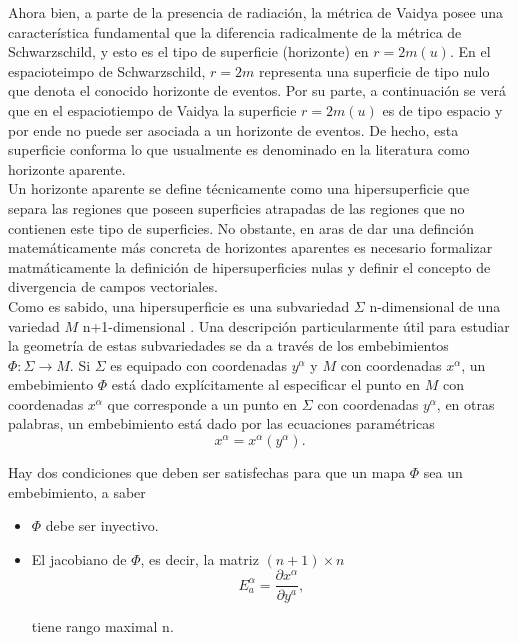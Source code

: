 \documentclass[16pt,a4paper]{article}
\numberwithin{equation}{section}
\theoremstyle{definition}
\begin{document}
Ahora bien, a parte de la presencia de radiación, la métrica de Vaidya posee una característica fundamental que la diferencia radicalmente de la métrica de Schwarzschild, y esto es el tipo de superficie (horizonte) en $r = 2m(u)$. En el espacioteimpo de Schwarzschild, $r = 2m$ representa una superficie de tipo nulo que denota el conocido horizonte de eventos. Por su parte, a continuación se verá que en el espaciotiempo de Vaidya la superficie $r = 2m(u)$ es de tipo espacio y por ende no puede ser asociada a un horizonte de eventos. De hecho, esta superficie conforma lo que usualmente es denominado en la literatura \cite{blau,griffiths2009,wald2010} como horizonte aparente.\\


Un horizonte aparente se define técnicamente como una hipersuperficie que separa las regiones que poseen superficies atrapadas de las regiones que no contienen este tipo de superficies. No obstante, en aras de dar una definción matemáticamente más concreta de horizontes aparentes es necesario formalizar matmáticamente la definición de hipersuperficies nulas y definir el concepto de divergencia de campos vectoriales.\\

Como es sabido, una hipersuperficie es una subvariedad $\Sigma$ n-dimensional de una variedad $M$ n+1-dimensional \cite{blau}. Una descripción particularmente útil para estudiar la geometría de estas subvariedades se da a través de los embebimientos $\Phi: \Sigma \to M$. Si $\Sigma$ es equipado con coordenadas $y^\alpha$ y $M$ con coordenadas $x^\alpha$, un embebimiento $\Phi$ está dado explícitamente al especificar el punto en $M$ con coordenadas $x^\alpha$ que corresponde a un punto en $\Sigma$ con coordenadas $y^\alpha$, en otras palabras, un embebimiento está dado por las ecuaciones paramétricas 
\begin{equation*}
x^\alpha = x^\alpha(y^\alpha).
\end{equation*}

Hay dos condiciones que deben ser satisfechas para que un mapa $\Phi$ sea un embebimiento, a saber
\begin{itemize}
	\item $\Phi$ debe ser inyectivo.
	\item El jacobiano de $\Phi$, es decir, la matriz $(n+1)\times n$
	\begin{equation*}
	E^{\alpha}_{a} = \frac{\partial x^\alpha}{\partial y^a},
	\end{equation*}
	
	tiene rango maximal n.
\end{itemize}
\end{document}
